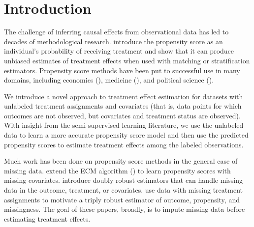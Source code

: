 \documentclass[aos]{imsart}
\begin{document}
\section{Introduction}
The challenge of inferring causal effects from observational data has led to decades of methodological research.
\cite{rosenbaum1983central} introduce the propensity score as an individual's probability of receiving treatment and show that 
it can produce unbiased estimates of treatment effects when used with matching or stratification estimators.
Propensity score methods have been put to successful use in many domains, including economics (\cite{heckman1997matching}), 
medicine (\cite{luo2010applying}), and political science (\cite{fong2018covariate}).

We introduce a novel approach to treatment effect estimation for datasets with unlabeled treatment assignments 
and covariates (that is, data points for which outcomes are not observed, but covariates and treatment status are observed). 
With insight from the semi-supervised learning literature, we use the unlabeled data to learn a more accurate propensity 
score model and then use the predicted propensity scores to estimate treatment effects among the labeled observations.

Much work has been done on propensity score methods in the general case of missing data. 
\cite{d2000estimating} extend the ECM algorithm (\cite{meng1993maximum}) to learn propensity scores with missing covariates. 
\cite{williamson2012doubly} introduce doubly robust estimators that can handle missing data in the outcome, treatment, or covariates.
\cite{zhang2016causal} use data with missing treatment assignments to motivate a triply robust estimator of outcome, propensity, and missingness.
The goal of these papers, broadly, is to impute missing data before estimating treatment effects. 
\end{document}
